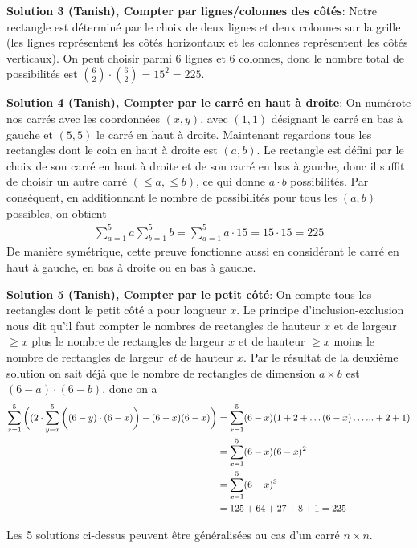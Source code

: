 {\textbf{Solution 3 (Tanish), Compter par lignes/colonnes des côtés}: Notre rectangle est déterminé par le choix de deux lignes et deux colonnes sur la grille (les lignes représentent les côtés horizontaux et les colonnes représentent les côtés verticaux). On peut choisir parmi $6$ lignes et $6$ colonnes, donc le nombre total de possibilités est $\binom{6}{2}\cdot\binom{6}{2}=15^2=225.$

\textbf{Solution 4 (Tanish), Compter par le carré en haut à droite}: On numérote nos carrés avec les coordonnées $(x, y)$, avec $(1,1)$ désignant le carré en bas à gauche et $(5, 5)$ le carré en haut à droite. Maintenant regardons tous les rectangles dont le coin en haut à droite est $(a, b)$. Le rectangle est défini par le choix de son carré en haut à droite et de son carré en bas à gauche, donc il suffit de choisir un autre carré $(\leq a, \leq b)$, ce qui donne $a \cdot b$ possibilités. Par conséquent, en additionnant le nombre de possibilités pour tous les $(a, b)$ possibles, on obtient
\begin{align*}
    \sum_{a=1}^5 a \sum_{b=1}^5 b = \sum_{a=1}^5 a \cdot 15 = 15\cdot15 = 225
\end{align*}
De manière symétrique, cette preuve fonctionne aussi en considérant le carré en haut à gauche, en bas à droite ou en bas à gauche.

\textbf{Solution 5 (Tanish), Compter par le petit côté}: On compte tous les rectangles dont le petit côté a pour longueur $x$. Le principe d'inclusion-exclusion nous dit qu'il faut compter le nombres de rectangles de hauteur $x$ et de largeur $\geq x$ plus le nombre de rectangles de largeur $x$ et de hauteur $\geq x$ moins le nombre de rectangles de largeur \emph{et} de hauteur $x$. Par le résultat de la deuxième solution on sait déjà que le nombre de rectangles de dimension $a\times b$ est $(6-a)\cdot (6-b)$, donc on a
\begin{align*}
    \sum_{x=1}^5 \bigg{(}( 2\cdot\sum_{y=x}^5 \bigg{(}(6-y)\cdot(6-x)\bigg{)} - (6-x)(6-x) \bigg{)} &= \sum_{x=1}^5 (6-x)(1 + 2 + \hdots (6-x) \hdots ... + 2 + 1) 
    \\ &= \sum_{x=1}^5 (6-x)(6-x)^2 
    \\ &= \sum_{x=1}^5 (6-x)^3 
    \\ &= 125 + 64 + 27 + 8 + 1 = 225
\end{align*}

Les 5 solutions ci-dessus peuvent être généralisées au cas d'un carré $n\times n$.

\newpage

}
